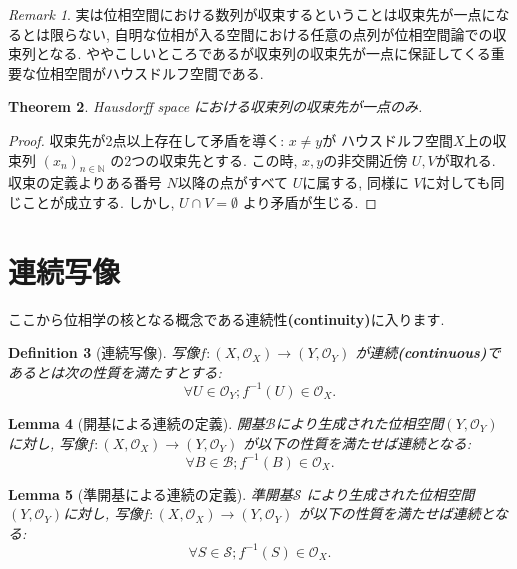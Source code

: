 \documentclass[lualatex]{ltjsbook}
\newtheorem{theorem}{Theorem}[chapter]
\newtheorem{lemma}[theorem]{Lemma}
\newtheorem{definition}[theorem]{Definition}
\theoremstyle{remark}
\newtheorem{remark}[theorem]{Remark}
\theoremstyle{plain}
\begin{document}
\begin{remark}
実は位相空間における数列が収束するということは収束先が一点になるとは限らない,  自明な位相が入る空間における任意の点列が位相空間論での収束列となる. 
ややこしいところであるが収束列の収束先が一点に保証してくる重要な位相空間がハウスドルフ空間である.	
\end{remark}

\begin{theorem}
Hausdorff space における収束列の収束先が一点のみ.
\end{theorem}

\begin{proof}
	収束先が2点以上存在して矛盾を導く: $x \neq y$が ハウスドルフ空間$X$上の収束列 $\left( x_n \right) _{n \in \mathbb{N} }$ の2つの収束先とする. 
	この時, $x, y$の非交開近傍 $U, V$が取れる. 
	収束の定義よりある番号 $N$以降の点がすべて $U$に属する,  同様に $V$に対しても同じことが成立する. 
	しかし,   $U\cap V = \emptyset$ より矛盾が生じる.
\end{proof}

\section{連続写像}%
\label{sec:連続写像}
ここから位相学の核となる概念である連続性\textbf{(continuity)}に入ります.
\begin{definition}[連続写像]
	写像$f: \left( X ,  \mathcal{O}_X \right) \to \left( Y,  \mathcal{O}_Y \right) $ が連続\textbf{(continuous)}であるとは次の性質を満たすとする:
	\[
	\forall U \in \mathcal{O}_Y; f^{-1}\left( U \right) \in \mathcal{O}_X 
	.\] 
\end{definition}


\begin{lemma}[開基による連続の定義]
開基$\mathcal{B}$により生成された位相空間$\left( Y,  \mathcal{O}_Y \right) $に対し, 
写像$f: \left( X ,  \mathcal{O}_X \right) \to \left( Y,  \mathcal{O}_Y \right) $ が以下の性質を満たせば連続となる:
\[
\forall B \in \mathcal{B}; f^{-1}\left( B \right) \in \mathcal{O}_X
.\] 

\end{lemma}

\begin{lemma}[準開基による連続の定義]
	準開基$\mathcal{S}$ により生成された位相空間$\left( Y,  \mathcal{O}_Y \right) $に対し,  写像$f: \left( X ,  \mathcal{O}_X \right) \to \left( Y,  \mathcal{O}_Y \right) $ が以下の性質を満たせば連続となる:
\[
\forall S \in \mathcal{S}; f^{-1}\left( S \right) \in \mathcal{O}_X
.\] 

\end{lemma}
\end{document}
